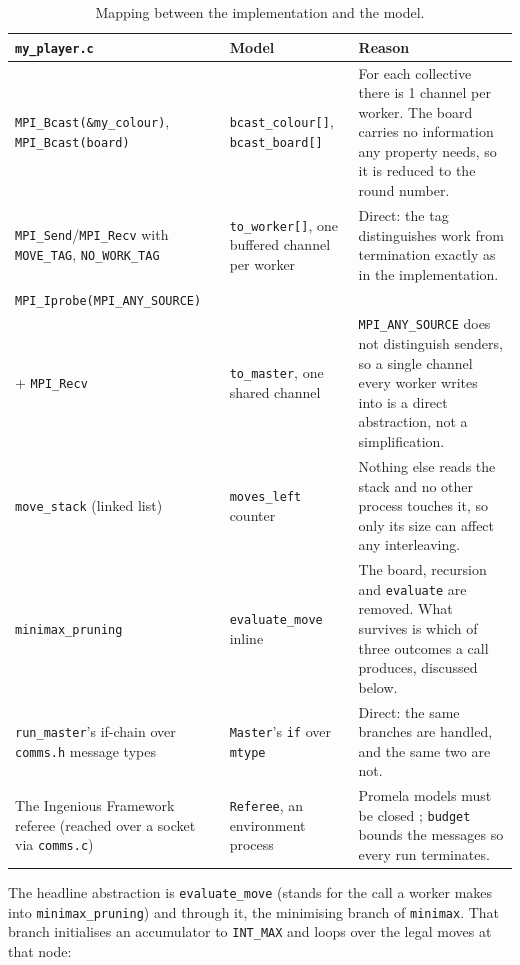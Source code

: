 \documentclass[10pt,a4paper]{article}
\newcommand{\code}[1]{\texttt{#1}}
\begin{document}
\begin{table}[htbp]
\centering
\caption{Mapping between the implementation and the model.}
\label{tab:mapping2}
\begin{tabular}{p{3.6cm} p{3.4cm} p{7cm}}
\toprule
\textbf{\code{my\_player.c}} & \textbf{Model} & \textbf{Reason} \\
\midrule
\code{MPI\_Bcast(\&my\_colour)}, \code{MPI\_Bcast(board)} &
\code{bcast\_colour[]}, \code{bcast\_board[]} &
For each collective there is 1 channel per worker. The board carries no
information any property needs, so it is reduced to the round number. \\
\addlinespace
\code{MPI\_Send}/\code{MPI\_Recv} with \code{MOVE\_TAG}, \code{NO\_WORK\_TAG} &
\code{to\_worker[]}, one buffered channel per worker &
Direct: the tag distinguishes work from termination exactly as in the
implementation. \\
\addlinespace
\code{MPI\_Iprobe(MPI\_ANY\_SOURCE)} \\ + \code{MPI\_Recv} &
\code{to\_master}, one shared channel &
\code{MPI\_ANY\_SOURCE} does not distinguish senders, so a single channel
every worker writes into is a direct abstraction, not a simplification. \\
\addlinespace
\code{move\_stack} (linked list) &
\code{moves\_left} counter &
Nothing else reads the stack and no other process touches it, so only its
size can affect any interleaving. \\
\addlinespace
\code{minimax\_pruning} &
\code{evaluate\_move} inline &
The board, recursion and \code{evaluate} are removed. What survives is
which of three outcomes a call produces, discussed below. \\
\addlinespace
\code{run\_master}'s if-chain over \code{comms.h} message types &
\code{Master}'s \code{if} over \code{mtype} &
Direct: the same branches are handled, and the same two are not. \\
\addlinespace
The Ingenious Framework referee (reached over a socket via \code{comms.c}) &
\code{Referee}, an environment process &
Promela models must be closed \cite{inggs_promela}; \code{budget} bounds
the messages so every run terminates. \\
\bottomrule
\end{tabular}
\end{table}

The headline abstraction is \code{evaluate\_move} (stands for the call
a worker makes into \code{minimax\_pruning}) and through it, the minimising
branch of \code{minimax}. That branch initialises an accumulator to
\code{INT\_MAX} and loops over the legal moves at that node:
\end{document}
